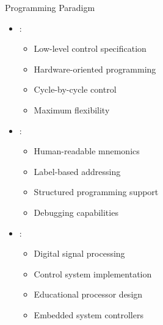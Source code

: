 \begin{frame}{Programming Paradigm}
\begin{itemize}
\item {}:
\begin{itemize}
\item Low-level control specification
\item Hardware-oriented programming
\item Cycle-by-cycle control
\item Maximum flexibility
\end{itemize}
\vspace{0.5cm}
\item {}:
\begin{itemize}
\item Human-readable mnemonics
\item Label-based addressing
\item Structured programming support
\item Debugging capabilities
\end{itemize}
\vspace{0.3cm}
\item {}:
\begin{itemize}
\item Digital signal processing
\item Control system implementation
\item Educational processor design
\item Embedded system controllers
\end{itemize}
\end{itemize}
\end{frame}

